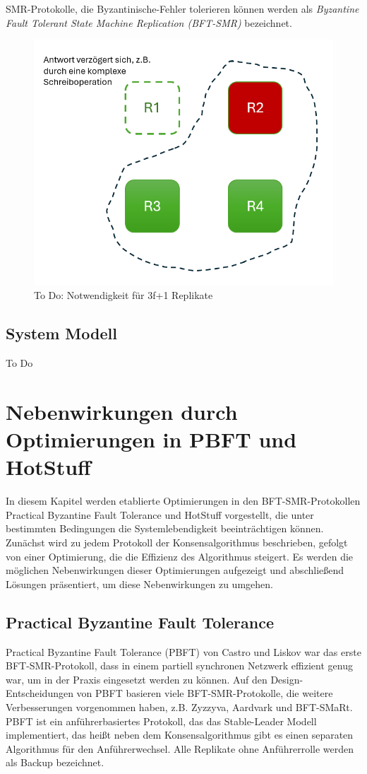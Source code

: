 \documentclass[nonacm,sigconf,natbib=false]{acmart}
\begin{document}
SMR-Protokolle, die Byzantinische-Fehler tolerieren können werden als \emph{Byzantine Fault Tolerant State Machine Replication (BFT-SMR)} bezeichnet.

\begin{figure}
  \centering
  \includegraphics[width=0.5\linewidth]{bft-quorum.png}
  \caption{To Do: Notwendigkeit für 3f+1 Replikate}
  \label{fig:bft-quorum}
\end{figure}

\subsection{System Modell}

To Do

\section{Nebenwirkungen durch Optimierungen in PBFT und HotStuff}

In diesem Kapitel werden etablierte Optimierungen in den BFT-SMR-Protokollen Practical Byzantine Fault Tolerance und HotStuff vorgestellt, die unter bestimmten Bedingungen die Systemlebendigkeit beeinträchtigen können. Zunächst wird zu jedem Protokoll der Konsensalgorithmus beschrieben, gefolgt von einer Optimierung, die die Effizienz des Algorithmus steigert. Es werden die möglichen Nebenwirkungen dieser Optimierungen aufgezeigt und abschließend Lösungen präsentiert, um diese Nebenwirkungen zu umgehen.

\subsection{Practical Byzantine Fault Tolerance}

Practical Byzantine Fault Tolerance (PBFT)\cite{pbft} von Castro und Liskov war das erste BFT-SMR-Protokoll, dass in einem partiell synchronen Netzwerk effizient genug war, um in der Praxis eingesetzt werden zu können. Auf den Design-Entscheidungen von PBFT basieren viele BFT-SMR-Protokolle, die weitere Verbesserungen vorgenommen haben, z.B. Zyzzyva\cite{zyzzyva}, Aardvark\cite{aardvark} und BFT-SMaRt\cite{bft-smart}. PBFT ist ein anführerbasiertes Protokoll, das das Stable-Leader Modell implementiert, das heißt neben dem Konsensalgorithmus gibt es einen separaten Algorithmus für den Anführerwechsel. Alle Replikate ohne Anführerrolle werden als Backup bezeichnet.
\end{document}
